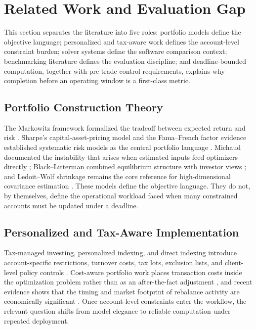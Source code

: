 \documentclass[10pt,a4paper]{extarticle}
\begin{document}
\section{Related Work and Evaluation Gap}
\label{sec:literature}

This section separates the literature into five roles: portfolio models
define the objective language; personalized and tax-aware work defines the
account-level constraint burden; solver systems define the software comparison
context; benchmarking literature defines the evaluation discipline; and
deadline-bounded computation, together with pre-trade control requirements,
explains why completion before an operating window is a first-class metric.

\subsection{Portfolio Construction Theory}

The Markowitz framework formalized the tradeoff between expected return and
risk \citep{markowitz1952}. Sharpe's capital-asset-pricing model and the
Fama--French factor evidence established systematic risk models as the central
portfolio language \citep{sharpe1964capital,fama1993common}. Michaud documented
the instability that arises when estimated inputs feed optimizers directly
\citep{michaud1989markowitz}; Black--Litterman combined equilibrium structure
with investor views \citep{black1992global}; and Ledoit--Wolf shrinkage remains
the core reference for high-dimensional covariance estimation
\citep{ledoitwolf2004,ledoit2017nonlinear}.
These models define the objective language. They do not, by themselves, define
the operational workload faced when many constrained accounts must be updated
under a deadline.

\subsection{Personalized and Tax-Aware Implementation}

Tax-managed investing, personalized indexing, and direct indexing introduce
account-specific restrictions, turnover costs, tax lots, exclusion lists, and
client-level policy controls
\citep{stein2017,khang2022,moehle2021taxaware,moehle2023lcso}. Cost-aware
portfolio work places transaction costs inside the optimization problem rather
than as an after-the-fact adjustment \citep{fan2025costaware}, and recent
evidence shows that the timing and market footprint of rebalance activity are
economically significant \citep{harvey2025rebalancing}. Once account-level
constraints enter the workflow, the relevant question shifts from model
elegance to reliable computation under repeated deployment.
\end{document}
